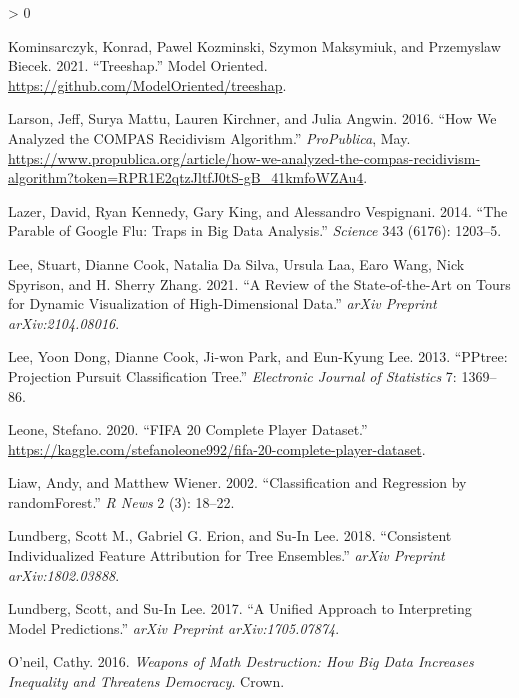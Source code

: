 \documentclass[
]{article}
\newlength{\cslhangindent}
\newenvironment{CSLReferences}[2] %
 {%
  \setlength{\parindent}{0pt}
  \ifodd #1 \everypar{\setlength{\hangindent}{\cslhangindent}}\ignorespaces\fi
  \ifnum #2 > 0
  \setlength{\parskip}{#2\baselineskip}
  \fi
 }%
 {}
\begin{document}
\begin{CSLReferences}{1}{0}
\leavevmode\hypertarget{ref-kominsarczyk_treeshap_2021}{}%
Kominsarczyk, Konrad, Pawel Kozminski, Szymon Maksymiuk, and Przemyslaw Biecek. 2021. {``Treeshap.''} Model Oriented. \url{https://github.com/ModelOriented/treeshap}.

\leavevmode\hypertarget{ref-larson_how_2016}{}%
Larson, Jeff, Surya Mattu, Lauren Kirchner, and Julia Angwin. 2016. {``How {We} {Analyzed} the {COMPAS} {Recidivism} {Algorithm}.''} \emph{ProPublica}, May. \url{https://www.propublica.org/article/how-we-analyzed-the-compas-recidivism-algorithm?token=RPR1E2qtzJltfJ0tS-gB_41kmfoWZAu4}.

\leavevmode\hypertarget{ref-lazer_parable_2014}{}%
Lazer, David, Ryan Kennedy, Gary King, and Alessandro Vespignani. 2014. {``The Parable of {Google} {Flu}: Traps in Big Data Analysis.''} \emph{Science} 343 (6176): 1203--5.

\leavevmode\hypertarget{ref-lee_review_2021}{}%
Lee, Stuart, Dianne Cook, Natalia Da Silva, Ursula Laa, Earo Wang, Nick Spyrison, and H. Sherry Zhang. 2021. {``A {Review} of the {State}-of-the-{Art} on {Tours} for {Dynamic} {Visualization} of {High}-Dimensional {Data}.''} \emph{arXiv Preprint arXiv:2104.08016}.

\leavevmode\hypertarget{ref-lee_pptree_2013}{}%
Lee, Yoon Dong, Dianne Cook, Ji-won Park, and Eun-Kyung Lee. 2013. {``{PPtree}: {Projection} Pursuit Classification Tree.''} \emph{Electronic Journal of Statistics} 7: 1369--86.

\leavevmode\hypertarget{ref-leone_fifa_2020}{}%
Leone, Stefano. 2020. {``{FIFA} 20 Complete Player Dataset.''} \url{https://kaggle.com/stefanoleone992/fifa-20-complete-player-dataset}.

\leavevmode\hypertarget{ref-liaw_classification_2002}{}%
Liaw, Andy, and Matthew Wiener. 2002. {``Classification and Regression by {randomForest}.''} \emph{R News} 2 (3): 18--22.

\leavevmode\hypertarget{ref-lundberg_consistent_2018}{}%
Lundberg, Scott M., Gabriel G. Erion, and Su-In Lee. 2018. {``Consistent Individualized Feature Attribution for Tree Ensembles.''} \emph{arXiv Preprint arXiv:1802.03888}.

\leavevmode\hypertarget{ref-lundberg_unified_2017}{}%
Lundberg, Scott, and Su-In Lee. 2017. {``A Unified Approach to Interpreting Model Predictions.''} \emph{arXiv Preprint arXiv:1705.07874}.

\leavevmode\hypertarget{ref-oneil_weapons_2016}{}%
O'neil, Cathy. 2016. \emph{Weapons of Math Destruction: {How} Big Data Increases Inequality and Threatens Democracy}. Crown.


\end{CSLReferences}
\end{document}
